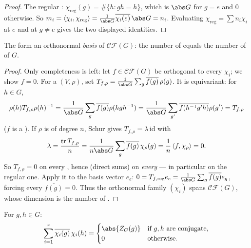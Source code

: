 \begin{proof}
The regular : $\chi_{\mathrm{reg}}(g) =
\#\{h : gh = h\}$, which is $\abs G$ for $g = e$ and $0$
otherwise. So $m_i = \langle \chi_i,\chi_{\mathrm{reg}}\rangle =
\frac1{\abs G}\overline{\chi_i(e)}\,\abs G = n_i$. Evaluating
$\chi_{\mathrm{reg}} = \sum n_i\chi_i$ at $e$ and at $g \neq e$
gives the two displayed identities.
\end{proof}

\begin{theorem}\label{thm:b3:representations:numberirr}
The   form an orthonormal \emph{basis} of
$\mathcal{CF}(G)$: the number of 
equals the number of  of $G$.
\end{theorem}

\begin{proof}
Only completeness is left: let $f \in \mathcal{CF}(G)$ be
orthogonal to every $\chi_i$; we show $f = 0$. For a
 $(V,\rho)$, set $T_{f,\rho} = \frac{1}{\abs G}
\sum_g \overline{f(g)}\,\rho(g)$. It is equivariant: for $h \in
G$,
\[
\rho(h)T_{f,\rho}\rho(h)^{-1} = \frac1{\abs G}\sum_g
\overline{f(g)}\rho(hgh^{-1})
= \frac1{\abs G}\sum_{g'}\overline{f(h^{-1}g'h)}\rho(g') =
T_{f,\rho}
\]
($f$ is a ). If $\rho$ is  of degree
$n$, Schur gives $T_{f,\rho} = \lambda\,\mathrm{id}$ with
\[
\lambda = \frac{\operatorname{tr}T_{f,\rho}}{n}
= \frac{1}{n\abs G}\sum_g \overline{f(g)}\,\chi_\rho(g)
= \frac1n\,\langle f, \chi_\rho\rangle = 0 .
\]
So $T_{f,\rho} = 0$ on every , hence (direct sums) on
\emph{every}  --- in particular on the regular one.
Apply it to the basis vector $e_e$: $0 = T_{f,\mathrm{reg}}e_e =
\frac1{\abs G}\sum_g\overline{f(g)}e_g$, forcing every
$\overline{f(g)} = 0$. Thus the orthonormal family
$(\chi_i)$ spans $\mathcal{CF}(G)$, whose dimension is the
number of .
\end{proof}

\begin{corollary}
\label{cor:b3:representations:column}
For $g, h \in G$:
\[
\sum_{i=1}^{r}\overline{\chi_i(g)}\,\chi_i(h) =
\begin{cases}
\abs{Z_G(g)} & \text{if } g, h \text{ are conjugate},\\
0 & \text{otherwise.}
\end{cases}
\]
\end{corollary}

